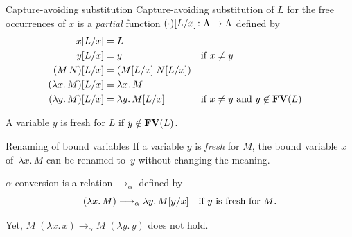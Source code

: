 \begin{frame}{Capture-avoiding substitution}
  Capture-avoiding substitution of $L$ for the \alert{free occurrences} of $x$ is a
  \emph{partial} function $(\cdot)[{L}/{x}]\colon \Lambda \to \Lambda$ defined by
  \begin{align*}
    x[{L}/{x}] & = L \\
    y[{L}/{x}] & = y && \text{if $x \neq y$} \\
    (M\, N)[{L}/{x}] & = (M[{L}/{x}]\; N[{L}/{x}]) \\
    (\lambda x.\, M)[{L}/{x}] & = \lambda x.\, M \\
    (\lambda y.\, M)[{L}/{x}] & = \lambda y.\, M[{L}/{x}]                                 &&\text{if $x \neq y$ and $y \not\in \mathbf{FV}(L)$}
  \end{align*}
  \begin{definition}[Freshness]
    A variable $y$ is \alert{fresh} for $L$ if $y \notin \mathbf{FV}(L)$.  
  \end{definition}
\end{frame}

\begin{frame}{Renaming of bound variables}
If a variable $y$ is \emph{fresh} for $M$, the bound variable $x$ of~$\lambda
x.\, M$ can be renamed to~$y$ without changing the meaning. 
\begin{definition}
  $\alpha$-conversion is a relation $\to_\alpha$ defined by
  \[
    (\lambda x.\, M) \longrightarrow_\alpha \lambda y.\, M[{y}/{x}]
    \quad\text{if $y$ is fresh for $M$}.
  \]
\end{definition}

Yet, $M\;(\lambda x.\, x) \longrightarrow_\alpha M\;(\lambda y.\, y)$ does not hold.
\end{frame}

